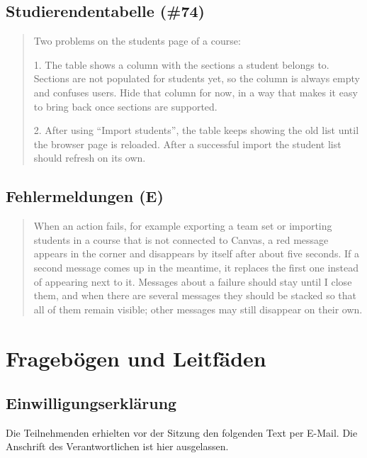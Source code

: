 \section{Studierendentabelle (\#74)}

\begin{quote}
Two problems on the students page of a course:

1. The table shows a column with the sections a student belongs to. Sections are not populated for students yet, so the column is always empty and confuses users. Hide that column for now, in a way that makes it easy to bring back once sections are supported.

2. After using ``Import students'', the table keeps showing the old list until the browser page is reloaded. After a successful import the student list should refresh on its own.
\end{quote}

\section{Fehlermeldungen (E)}

\begin{quote}
When an action fails, for example exporting a team set or importing students in a course that is not connected to Canvas, a red message appears in the corner and disappears by itself after about five seconds. If a second message comes up in the meantime, it replaces the first one instead of appearing next to it. Messages about a failure should stay until I close them, and when there are several messages they should be stacked so that all of them remain visible; other messages may still disappear on their own.
\end{quote}

\chapter{Fragebögen und Leitfäden}
\label{app:frageboegen}

\section{Einwilligungserklärung}
\label{app:einwilligung}

Die Teilnehmenden erhielten vor der Sitzung den folgenden Text per E-Mail. Die Anschrift des Verantwortlichen ist hier ausgelassen.

